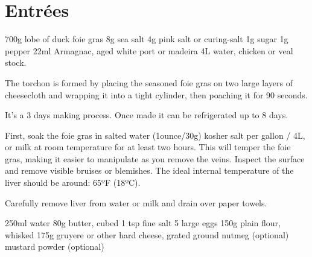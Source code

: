 \chapter{Entr\'ees}
\minitoc



\begin{ingreds}
    700g lobe of duck foie gras
    8g sea salt
    4g pink salt or curing-salt
    1g sugar
    1g pepper
    22ml Armagnac, aged white port or madeira 
    4L water, chicken or veal stock.
\end{ingreds}

\begin{method}
The torchon is formed by placing the seasoned foie gras on two large layers of 
cheesecloth and wrapping it into a tight cylinder, then poaching it for 90 seconds. 

It’s a 3 days making process. Once made it can be refrigerated up to 8 days. 

First, soak the foie gras in salted water (1ounce/30g) kosher salt per gallon / 4L, 
or milk at room temperature for at least two hours. This will temper the foie gras, 
making it easier to manipulate as you remove the veins. 
Inspect the surface and remove visible bruises or blemishes. 
The ideal internal temperature of the liver should be around: 65ºF (18ºC). 

Carefully remove liver from water or milk and drain over paper towels.
\end{method}



\begin{ingreds}
	250ml water
    80g butter, cubed
    1 tsp fine salt
    5 large eggs
    150g plain flour, whisked
    175g gruyere or other hard cheese, grated
    ground nutmeg (optional)
    mustard powder (optional)
\end{ingreds}

